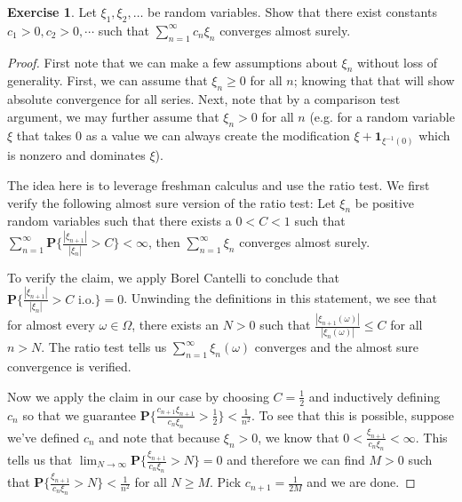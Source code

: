 \documentclass{amsbook}
\theoremstyle{definition}
\newtheorem{xca}{Exercise}
\theoremstyle{remark}
\newcommand{\probability}[1]{\textbf{P}\{#1\}}
\newcommand{\characteristic}[1]{\textbf{1}_{#1}}
\newcommand{\abs}[1]{\left \vert #1 \right \vert}
\begin{document}
\begin{xca}Let $\xi_1, \xi_2, \dots$ be random variables.  Show that
  there exist constants $c_1 > 0, c_2 >0, \cdots$ such that
  $\sum_{n=1}^\infty c_n \xi_n$ converges almost surely.
\end{xca}
\begin{proof}First note that we can make a few assumptions about $\xi_n$ without
loss of generality.  First, we can assume that $\xi_n \geq 0$ for all
$n$; knowing that that will show absolute convergence for all series.  Next,
note that by a comparison test argument, we may further assume that $\xi_n >
0$ for all $n$ (e.g. for a random variable $\xi$ that takes $0$ as a value we can
always create the modification $\xi + \characteristic{\xi^{-1}(0)}$
which is nonzero and dominates $\xi$).  

The idea here is to leverage freshman calculus and use the ratio
test.  We first verify the following almost sure version of the ratio
test: Let $\xi_n$ be positive random variables such that there exists
a $0 < C < 1$ such that
$\sum_{n=1}^\infty \probability{\frac{\abs{\xi_{n+1}}}{\abs{\xi_n}} >
  C} < \infty$, then $\sum_{n=1}^\infty \xi_n$ converges almost
surely.

To verify the claim, we apply Borel Cantelli to conclude that $\probability{\frac{\abs{\xi_{n+1}}}{\abs{\xi_n}} >
  C \text{ i.o.}} = 0$.  Unwinding the definitions in this statement, we see that for
almost every $\omega \in \Omega$, there exists an $N>0$ such that
$\frac{\abs{\xi_{n+1}(\omega)}}{\abs{\xi_n(\omega)}} \leq C$
for all $n > N$.  The ratio test tells us $\sum_{n=1}^\infty
\xi_n(\omega)$  converges and the almost sure convergence is verified.

Now we apply the claim in our case by choosing $C=\frac{1}{2}$ and inductively defining $c_n$ so
that we guarantee $\probability{\frac{c_{n+1} \xi_{n+1}}{c_n \xi_n} >
  \frac{1}{2}} < \frac{1}{n^2}$.  To see that this is possible,
suppose we've defined $c_n$ and note that because $\xi_n > 0$, we know
that $0 < \frac{\xi_{n+1}}{c_n \xi_n} < \infty$.  This tells us that
$\lim_{N \to \infty} \probability{\frac{\xi_{n+1}}{c_n \xi_n} > N} =0$
and therefore we can find $M>0$ such that
$\probability{\frac{\xi_{n+1}}{c_n \xi_n} > N} < \frac{1}{n^2}$ for
all $N\geq M$.  Pick $c_{n+1} = \frac{1}{2M}$ and we are done.


\end{proof}
\end{document}

